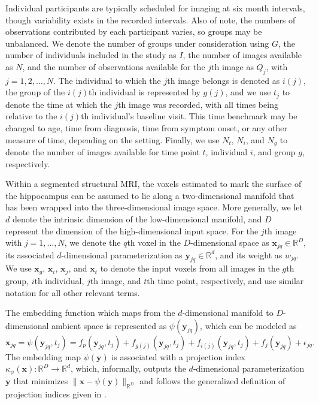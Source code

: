 \documentclass[11pt,reqno]{article}
\theoremstyle{definition}
\begin{document}
Individual participants are typically scheduled for imaging at six month intervals, though variability exists in the recorded intervals. Also of note, the numbers of observations contributed by each participant varies, so groups may be unbalanced. We denote the number of groups under consideration using $G$, the number of individuals included in the study as $I$, the number of images available as $N$, and the number of observations available for the $j$th image as $Q_j$, with $j = 1, 2, \dots, N$. The individual to which the $j$th image belongs is denoted as $i(j)$, the group of the $i(j)$th individual is represented by $g(j)$, and we use $t_j$ to denote the time at which the $j$th image was recorded, with all times being relative to the $i(j)$th individual's baseline visit. This time benchmark may be changed to age, time from diagnosis, time from symptom onset, or any other measure of time, depending on the setting. Finally, we use $N_t$, $N_i$, and $N_g$ to denote the number of images available for time point $t$, individual $i$, and group $g$, respectively.

Within a segmented structural MRI, the voxels estimated to mark the surface of the hippocampus can be assumed to lie along a two-dimensional manifold that has been wrapped into the three-dimensional image space. More generally, we let $d$ denote the intrinsic dimension of the low-dimensional manifold, and $D$ represent the dimension of the high-dimensional input space. For the $j$th image with $j = 1, \dots, N$, we denote the $q$th voxel in the $D$-dimensional space as $\mathbf{x}_{jq} \in \mathbb{R}^{D}$, its associated $d$-dimensional parameterization as $\mathbf{y}_{jq} \in \mathbb{R}^{d}$, and its weight as $w_{jq}$. We use $\mathbf{x}_g$, $\mathbf{x}_i$, $\mathbf{x}_{j}$, and $\mathbf{x}_t$ to denote the input voxels from all images in the $g$th group, $i$th individual, $j$th image, and $t$th time point, respectively, and use similar notation for all other relevant terms.

The embedding function which maps from the $d$-dimensional manifold to $D$-dimensional ambient space is represented as $\psi(\mathbf{y}_{jq})$, which can be modeled as 
\begin{equation}
  \mathbf{x}_{jq} = \psi(\mathbf{y}_{jq}, t_j) = f_p(\mathbf{y}_{jq}, t_{j}) + f_{g(j)}(\mathbf{y}_{jq}, t_{j}) + f_{i(j)}(\mathbf{y}_{jq}, t_{j}) + f_j(\mathbf{y}_{jq}) + \epsilon_{jq}. \label{eq:2}
\end{equation}
The embedding map $\psi(\mathbf{y})$ is associated with a projection index $\kappa_{\psi}(\mathbf{x}): \mathbb{R}^{D} \to \mathbb{R}^{d}$, which, informally, outputs the $d$-dimensional parameterization $\mathbf{y}$ that minimizes $\|\mathbf{x} - \psi(\mathbf{y})\|_{\mathbb{R}^{D}}$ and follows the generalized definition of projection indices given in \cite{mengPrincipalManifoldEstimation2021}.
\end{document}
